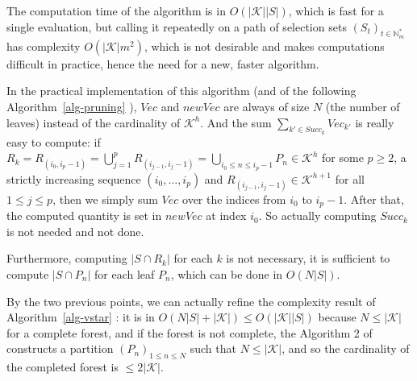 \documentclass[
  11pt,
  a4paper,
]{article}
\theoremstyle{plain}
\theoremstyle{definition}
\theoremstyle{plain}
\theoremstyle{definition}
\theoremstyle{plain}
\theoremstyle{remark}
\newcounter{quartocallouttipno}
\newcommand{\quartocallouttip}[1]{\refstepcounter{quartocallouttipno}\label{#1}}
\begin{document}
The computation time of the algorithm is in \(O(|\mathcal{K}||S|)\),
which is fast for a single evaluation, but calling it repeatedly on a
path of selection sets \((S_t)_{t\in\mathbb{N}_m^*}\) has complexity
\(O(|\mathcal{K}|m^2)\), which is not desirable and makes computations
difficult in practice, hence the need for a new, faster algorithm.

\begin{tcolorbox}[enhanced jigsaw, leftrule=.75mm, bottomtitle=1mm, left=2mm, coltitle=black, bottomrule=.15mm, opacityback=0, colbacktitle=quarto-callout-tip-color!10!white, breakable, titlerule=0mm, colframe=quarto-callout-tip-color-frame, colback=white, arc=.35mm, toptitle=1mm, rightrule=.15mm, opacitybacktitle=0.6, title=\textcolor{quarto-callout-tip-color}{\faLightbulb}\hspace{0.5em}{Tip \ref*{tip-algo1} }, toprule=.15mm]

\quartocallouttip{tip-algo1} 

In the practical implementation of this algorithm (and of the following
 Algorithm~\ref{alg-pruning} ), \(Vec\) and \(newVec\) are always of
size \(N\) (the number of leaves) instead of the cardinality of
\(\mathcal{K}^h\). And the sum \(\sum_{k'\in Succ_k} Vec_{k'}\) is
really easy to compute: if
\(R_k= R_{(i_0,i_{p}-1)}= \bigcup_{ j=1}^{p} R_{(i_{ j-1}, i_{ j}-1)}=\bigcup_{i_0\leq n\leq i_{p}-1}P_n\in\mathcal{K}^h\)
for some \(p\geq2\), a strictly increasing sequence
\((i_0,\dotsc,i_{p})\) and
\(R_{(i_{ j-1}, i_{ j}-1)}\in\mathcal{K}^{h+1}\) for all
\(1\leq j\leq p\), then we simply sum \(Vec\) over the indices from
\(i_{0}\) to \(i_{p}-1\). After that, the computed quantity is set in
\(newVec\) at index \(i_0\). So actually computing \(Succ_k\) is not
needed and not done.

Furthermore, computing \(|S\cap R_k|\) for each \(k\) is not necessary,
it is sufficient to compute \(|S\cap P_n|\) for each leaf \(P_n\), which
can be done in \(O(N|S|)\).

By the two previous points, we can actually refine the complexity result
of  Algorithm~\ref{alg-vstar} : it is in
\(O(N|S|+|\mathcal{K}|)\leq O(|\mathcal{K}||S|)\) because
\(N\leq|\mathcal{K}|\) for a complete forest, and if the forest is not
complete, the Algorithm 2 of \citet{MR4178188} constructs a partition
\((P_n)_{1\leq n\leq N}\) such that \(N\leq|\mathcal{K}|\), and so the
cardinality of the completed forest is \(\leq 2|\mathcal{K}|\).

\end{tcolorbox}
\end{document}
